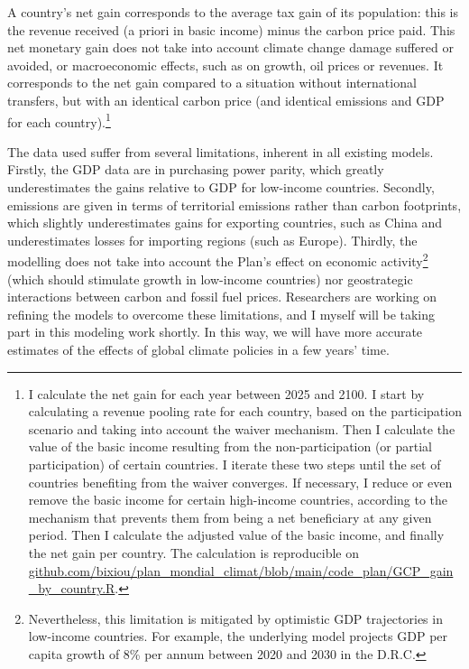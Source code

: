 \documentclass[a5paper,english,openany]{memoir}
\begin{document}
A country's net gain corresponds to the average tax gain of its population: this is the revenue received (a priori in basic income) minus the carbon price paid. This net monetary gain does not take into account climate change damage suffered or avoided, or macroeconomic effects, such as on growth, oil prices or revenues. %
It corresponds to the net gain compared to a situation without international transfers, but with an identical carbon price (and identical emissions and GDP for each country).\footnote{I calculate the net gain for each year between 2025 and 2100.   
I start by calculating a revenue pooling rate for each country, based on the participation scenario and taking into account the waiver mechanism. Then I calculate the value of the basic income resulting from the non-participation (or partial participation) of certain countries. I iterate these two steps until the set of countries benefiting from the waiver converges. 
If necessary, I reduce or even remove the basic income for certain high-income countries,  according to the mechanism that prevents them from being a net beneficiary at any given period. Then I calculate the adjusted value of the basic income, and finally the net gain per country. The calculation is reproducible on \href{https://github.com/bixiou/plan_mondial_climat/blob/main/code_plan/GCP_gain_by_country.R}{github.com/bixiou/plan\_mondial\_climat/blob/main/code\_plan/GCP\_gain\_by\_country.R}.}

The data used suffer from several limitations, inherent in all existing models. Firstly, the GDP data are in purchasing power parity, which greatly underestimates the gains relative to GDP for low-income countries. Secondly, emissions are given in terms of territorial emissions rather than carbon footprints, which slightly underestimates gains for exporting countries, such as China %
and underestimates losses for importing regions (such as Europe). %
Thirdly, the modelling does not take into account the Plan's effect on economic activity\footnote{Nevertheless, this limitation is mitigated by optimistic GDP trajectories in low-income countries. For example, the underlying model projects GDP per capita growth of 8\% per annum between 2020 and 2030 in the D.R.C.} (which should stimulate growth in low-income countries) nor geostrategic interactions between carbon and fossil fuel prices. Researchers are working on refining the models to overcome these limitations, and I myself will be taking part in this modeling %
work shortly. In this way, we will have more accurate estimates of the effects of global climate policies in a few years' time. %
\end{document}
